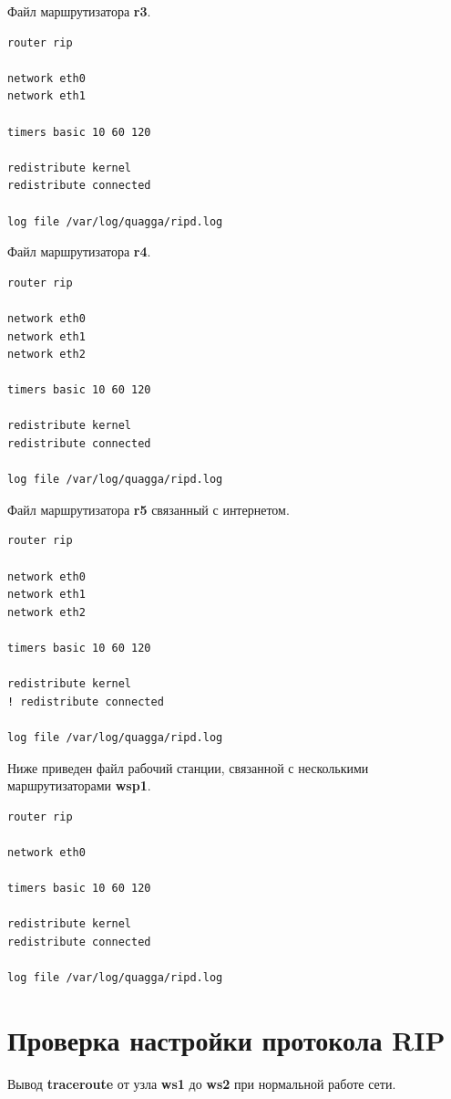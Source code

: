 \documentclass[a4paper,12pt]{article}
\begin{document}
Файл  маршрутизатора \textbf{r3}.

\begin{Verbatim}
router rip

network eth0
network eth1
    
timers basic 10 60 120
    
redistribute kernel
redistribute connected
    
log file /var/log/quagga/ripd.log    
\end{Verbatim}


Файл  маршрутизатора \textbf{r4}.

\begin{Verbatim}
router rip

network eth0
network eth1
network eth2

timers basic 10 60 120

redistribute kernel
redistribute connected

log file /var/log/quagga/ripd.log
\end{Verbatim}


Файл  маршрутизатора \textbf{r5} связанный с интернетом.

\begin{Verbatim}
router rip

network eth0
network eth1
network eth2

timers basic 10 60 120

redistribute kernel
! redistribute connected

log file /var/log/quagga/ripd.log
\end{Verbatim}


Ниже приведен файл  рабочий станции, связанной с несколькими маршрутизаторами \textbf{wsp1}.

\begin{Verbatim}
router rip

network eth0

timers basic 10 60 120

redistribute kernel
redistribute connected

log file /var/log/quagga/ripd.log    
\end{Verbatim}


\section{Проверка настройки протокола RIP}

Вывод \textbf{traceroute} от узла \textbf{ws1} до \textbf{ws2} при нормальной работе сети.
\end{document}
